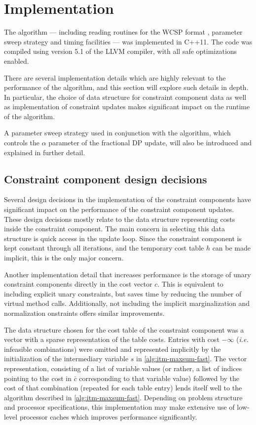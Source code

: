 \section{Implementation}
The algorithm --- including reading routines for the WCSP format \parencite{wcspformat}, parameter sweep strategy and timing facilities --- was implemented in C++11.
The code was compiled using version 5.1 of the LLVM compiler, with all safe optimizations enabled.

There are several implementation details which are highly relevant to the performance of the algorithm, and this section will explore such details in depth.
In particular, the choice of data structure for constraint component data as well as implementation of constraint updates makes significant impact on the runtime of the algorithm.

A parameter sweep strategy used in conjunction with the algorithm, which controls the \(\alpha\) parameter of the fractional DP update, will also be introduced and explained in further detail.

\subsection{Constraint component design decisions}
Several design decisions in the implementation of the constraint components have significant impact on the performance of the constraint component updates.
These design decisions mostly relate to the data structure representing costs inside the constraint component.
The main concern in selecting this data structure is quick access in the update loop.
Since the constraint component is kept constant through all iterations, and the temporary cost table \(h\) can be made implicit, this is the only major concern.

Another implementation detail that increases performance is the storage of unary constraint components directly in the cost vector \(c\).
This is equivalent to including explicit unary constraints, but saves time by reducing the number of virtual method calls.
Additionally, not including the implicit marginalization and normalization onstraints \parencite[\pno~12]{Wedelin13} offers similar improvements.

The data structure chosen for the cost table of the constraint component was a vector with a sparse representation of the table costs.
Entries with cost \(-\infty\) (\emph{i.e.} infeasible combinations) were omitted and represented implicitly by the initialization of the intermediary variable \(s\) in \cref{alg:itm-maxsum-fast}.
The vector representation, consisting of a list of variable values (or rather, a list of indices pointing to the cost in \(\bar{c}\) corresponding to that variable value) followed by the cost of that combination (repeated for each table entry) lends itself well to the algorithm described in \cref{alg:itm-maxsum-fast}.
Depending on problem structure and processor specifications, this implementation may make extensive use of low-level processor caches which improves performance significantly.

